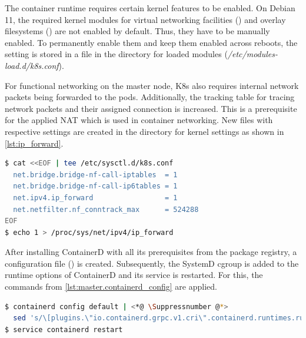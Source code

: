 The container runtime requires certain kernel features to be enabled. On Debian 11, the required kernel modules for virtual networking facilities () and overlay filesystems () are not enabled by default. Thus, they have to be manually enabled.
To permanently enable them and keep them enabled across reboots, the setting is stored in a file in the directory for loaded modules (\textit{/etc/modules-load.d/k8s.conf}).

For functional networking on the master node, \ac{K8s} also requires internal network packets being forwarded to the pods. Additionally, the tracking table for tracing network packets and their assigned connection is increased. This is a prerequisite for the applied \ac{NAT} which is used in container networking.
New files with respective settings are created in the directory for kernel settings as shown in \autoref{lst:ip_forward}.
\begin{lstlisting}[label=lst:ip_forward, caption={Bash commands for enabling \ac{IP} forwarding and network filtering.}, language=bash]
$ cat <<EOF | tee /etc/sysctl.d/k8s.conf 
  net.bridge.bridge-nf-call-iptables  = 1
  net.bridge.bridge-nf-call-ip6tables = 1
  net.ipv4.ip_forward                 = 1 
  net.netfilter.nf_conntrack_max      = 524288 
EOF
$ echo 1 > /proc/sys/net/ipv4/ip_forward
\end{lstlisting}

After installing ContainerD with all its prerequisites from the package registry, a configuration file () is created.
Subsequently, the SystemD \ac{cgroup} is added to the runtime options of ContainerD and its service is restarted. For this, the commands from \autoref{lst:master.containerd_config} are applied.
\vspace{1em}
\begin{lstlisting}[label=lst:master.containerd_config, caption={Bash command for setting up containerd config},language=bash, morekeywords={sudo, kubeadm, tee, service}]
$ containerd config default | <*@ \Suppressnumber @*>
  sed 's/\[plugins.\"io.containerd.grpc.v1.cri\".containerd.runtimes.runc.options\]/&\n SystemdCgroup = true/' | tee /etc/containerd/config.toml >/dev/null <*@ \Reactivatenumber @*>
$ service containerd restart
\end{lstlisting}

